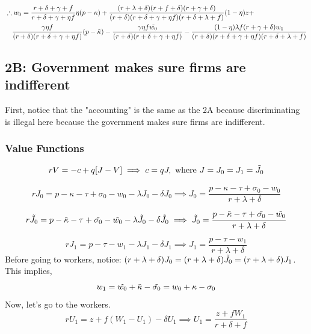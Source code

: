 \documentclass[12pt]{article} %
\theoremstyle{definition}
\begin{document}
\begin{equation}
    \begin{multlined}
         \therefore w_0 = \frac{r+\delta+\gamma +f}{r+\delta+\gamma+\eta f}\eta (p-\kappa) + \frac{(r+\lambda+\delta)(r+f+\delta)(r+\gamma+\delta)}{(r+\delta)(r+\delta+\gamma+\eta f)(r+\delta+\lambda+f)} (1-\eta) z + \\  
\frac{\gamma \eta f}{(r+\delta)(r+\delta+\gamma +\eta f)}(p-\Tilde{\kappa}) - \frac{\gamma \eta f\Tilde{w_0}}{(r+\delta)(r+\delta+\gamma +\eta f)}- \frac{(1-\eta)\lambda f (r+\gamma+\delta)w_1}{(r+\delta)(r+\delta+\gamma + \eta f)(r+\delta+\lambda+f)} 
    \end{multlined}
\end{equation}


\subsection{2B: Government makes sure firms are indifferent}
First, notice that the "accounting" is the same as the 2A because discriminating is illegal here because the government makes sure firms are indifferent. 

\subsubsection{Value Functions}
\begin{equation}
  rV = -c+q[J-V] \implies c=qJ, \text{ where } J = J_0=J_1=\Tilde{J_0}
\end{equation}

\begin{equation}
    rJ_0 =p-\kappa-\tau+\sigma_0-w_0-\lambda J_0 - \delta J_0 \implies J_0 = \frac{p-
    \kappa-\tau+\sigma_0-w_0}{r + \lambda + \delta}
\end{equation}

\begin{equation}
    r\Tilde{J_0} =p-\Tilde{\kappa}-\tau+\Tilde{\sigma_0}-\Tilde{w_0}-\lambda \Tilde{J_0} - \delta \Tilde{J_0} \implies \Tilde{J_0} = \frac{p-\Tilde{\kappa}-\tau+\Tilde{\sigma_0}-\Tilde{w_0}}{r + \lambda + \delta}
\end{equation}

\begin{equation}
    rJ_1 =p-\tau-w_1-\lambda J_1 - \delta J_1 \implies J_1 = \frac{p-\tau-w_1}{r + \lambda + \delta}
\end{equation}
Before going to workers, notice: $(r+\lambda+\delta)J_0=(r +\lambda+\delta) \Tilde{J_0}=(r+\lambda+\delta)J_1$. \\ This implies, 
\begin{equation}
    w_1=\Tilde{w_0}+\Tilde{\kappa}-\Tilde{\sigma_0}=w_0+\kappa-\sigma_0
\end{equation}
Now, let's go to the workers. 
\begin{equation}
    rU_1 =z+f(W_1-U_1)- \delta U_1 \implies U_1 = \frac{z + f W_1}{r + \delta + f}
\end{equation}
\end{document}
